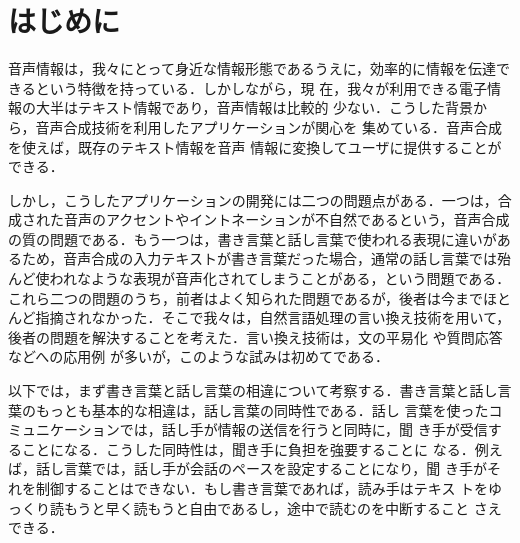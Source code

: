 \documentclass{nlp}
\begin{document}


\maketitle


\section{はじめに}
音声情報は，我々にとって身近な情報形態であるうえに，効率的に情報を伝達で
きるという特徴を持っている\cite{Hayashi99,Nadamoto01}．しかしながら，現
在，我々が利用できる電子情報の大半はテキスト情報であり，音声情報は比較的
少ない．こうした背景から，音声合成技術を利用したアプリケーションが関心を
集めている\cite{Fukuhara01}．音声合成を使えば，既存のテキスト情報を音声
情報に変換してユーザに提供することができる．

しかし，こうしたアプリケーションの開発には二つの問題点がある．一つは，合
成された音声のアクセントやイントネーションが不自然であるという，音声合成
の質の問題である．もう一つは，書き言葉と話し言葉で使われる表現に違いがあ
るため，音声合成の入力テキストが書き言葉だった場合，通常の話し言葉では殆
んど使われなような表現が音声化されてしまうことがある，という問題である．
これら二つの問題のうち，前者はよく知られた問題であるが，後者は今までほと
んど指摘されなかった．そこで我々は，自然言語処理の言い換え技術を用いて，
後者の問題を解決することを考えた．言い換え技術は，文の平易化
\cite{Inui01,Inui03}や質問応答\cite{Lin01,Ulf02,Duclaye03}などへの応用例
が多いが，このような試みは初めてである．

以下では，まず書き言葉と話し言葉の相違について考察する．書き言葉と話し言
葉のもっとも基本的な相違は，話し言葉の同時性である\cite{Hatake87}．話し
言葉を使ったコミュニケーションでは，話し手が情報の送信を行うと同時に，聞
き手が受信することになる．こうした同時性は，聞き手に負担を強要することに
なる．例えば，話し言葉では，話し手が会話のペースを設定することになり，聞
き手がそれを制御することはできない．もし書き言葉であれば，読み手はテキス
トをゆっくり読もうと早く読もうと自由であるし，途中で読むのを中断すること
さえできる．
\end{document}

